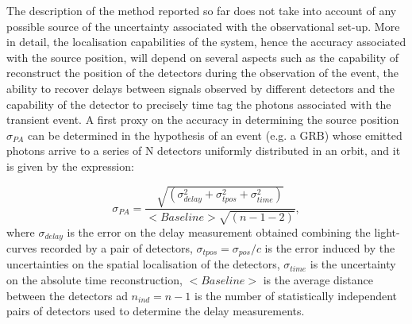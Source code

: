 \documentclass[]{spie}  %
\def \her{\textit{HERMES}\xspace}
\begin{document}
The description of the method reported so far does not take into account of any possible source of the uncertainty associated with the observational set-up. More in detail, the localisation capabilities of the system, hence the accuracy associated with the source position, will depend on several aspects such as the capability of reconstruct the position of the detectors during the observation of the event, the ability to recover delays between signals observed by different detectors and the capability of the detector to precisely time tag the photons associated with the transient event. 
A first proxy on the accuracy in determining the source position $\sigma_{PA}$ can be determined in the hypothesis of an event (e.g. a GRB) whose emitted photons arrive to a series of N detectors uniformly distributed in an orbit, and it is given by the expression:

\begin{equation}
\label{eq:sigma_pos}
\sigma_{PA} = \dfrac{\sqrt{(\sigma^2_{delay}+\sigma^2_{tpos}+\sigma^2_{time})}}{<Baseline>\sqrt{(n-1-2)}},
\end{equation}
%
where $\sigma_{delay}$ is the error on the delay measurement obtained combining the light-curves recorded by a pair of detectors, $\sigma_{tpos}=\sigma_{pos}/c$ is the error induced by the uncertainties on the spatial localisation of the detectors, $\sigma_{time}$ is the uncertainty on the absolute time reconstruction, $<Baseline>$ is the average distance between the detectors ad $n_{ind} = n-1$ is the number of statistically independent pairs of detectors used to determine the delay measurements.\\

	
\end{document}
